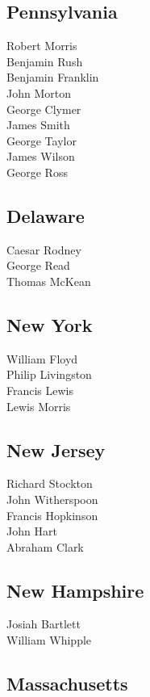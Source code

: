 \documentclass[a4paper,landscape,10pt]{article}
\begin{document}
\begin{multicols}{5}
\subsection*{Pennsylvania}

Robert Morris\\
Benjamin Rush\\
Benjamin Franklin\\
John Morton\\
George Clymer\\
James Smith\\
George Taylor\\
James Wilson\\
George Ross

\subsection*{Delaware}

Caesar Rodney\\
George Read\\
Thomas McKean

\subsection*{New York}

William Floyd\\
Philip Livingston\\
Francis Lewis\\
Lewis Morris

\subsection*{New Jersey}

Richard Stockton\\
John Witherspoon\\
Francis Hopkinson\\
John Hart\\
Abraham Clark

\subsection*{New Hampshire}

Josiah Bartlett\\
William Whipple\\

\subsection*{Massachusetts}


\end{multicols}
\end{document}
